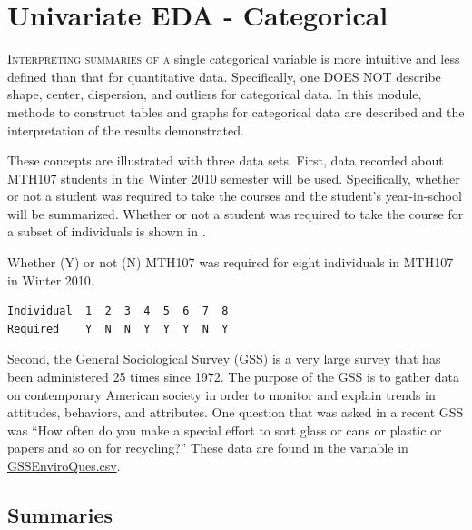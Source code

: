 \documentclass[10pt,openany]{book}\usepackage[]{graphicx}\usepackage[]{color}
\begin{document}
\chapter{Univariate EDA - Categorical} \label{chap:UnivEDACat}

\vspace{-24pt}
\minitoc
\vspace{12pt}

\lettrine{I}{nterpreting summaries of a} single categorical variable is more intuitive and less defined than that for quantitative data. Specifically, one DOES NOT describe shape, center, dispersion, and outliers for categorical data. In this module, methods to construct tables and graphs for categorical data are described and the interpretation of the results demonstrated.


These concepts are illustrated with three data sets. First, data recorded about MTH107 students in the Winter 2010 semester will be used. Specifically, whether or not a student was required to take the courses and the student's year-in-school will be summarized. Whether or not a student was required to take the course for a subset of individuals is shown in .

\begin{table}[htbp]
  \caption{Whether (Y) or not (N) MTH107 was required for eight individuals in MTH107 in Winter 2010.}
  \label{tab:MTH107Subset}
  \centering
  \begin{Verbatim}[xleftmargin=10mm]
Individual  1  2  3  4  5  6  7  8
Required    Y  N  N  Y  Y  Y  N  Y
  \end{Verbatim}
\end{table}
\vspace{-12pt}

Second, the General Sociological Survey (GSS) is a very large survey that has been administered 25 times since 1972. The purpose of the GSS is to gather data on contemporary American society in order to monitor and explain trends in attitudes, behaviors, and attributes. One question that was asked in a recent GSS was ``How often do you make a special effort to sort glass or cans or plastic or papers and so on for recycling?''  These data are found in the  variable in \href{https://raw.githubusercontent.com/droglenc/NCData/master/GSSEnviroQues.csv}{GSSEnviroQues.csv}.


\section{Summaries}
\end{document}
